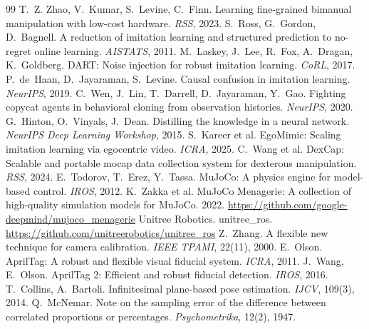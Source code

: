 \documentclass[10pt,twocolumn]{article}
\begin{document}
\begin{thebibliography}{99}\small\setlength{\itemsep}{1pt}
 T.~Z. Zhao, V.~Kumar, S.~Levine, C.~Finn. Learning fine-grained bimanual manipulation with low-cost hardware. \emph{RSS}, 2023.
 S.~Ross, G.~Gordon, D.~Bagnell. A reduction of imitation learning and structured prediction to no-regret online learning. \emph{AISTATS}, 2011.
 M.~Laskey, J.~Lee, R.~Fox, A.~Dragan, K.~Goldberg. DART: Noise injection for robust imitation learning. \emph{CoRL}, 2017.
 P.~de~Haan, D.~Jayaraman, S.~Levine. Causal confusion in imitation learning. \emph{NeurIPS}, 2019.
 C.~Wen, J.~Lin, T.~Darrell, D.~Jayaraman, Y.~Gao. Fighting copycat agents in behavioral cloning from observation histories. \emph{NeurIPS}, 2020.
 G.~Hinton, O.~Vinyals, J.~Dean. Distilling the knowledge in a neural network. \emph{NeurIPS Deep Learning Workshop}, 2015.
 S.~Kareer et al. EgoMimic: Scaling imitation learning via egocentric video. \emph{ICRA}, 2025.
 C.~Wang et al. DexCap: Scalable and portable mocap data collection system for dexterous manipulation. \emph{RSS}, 2024.
 E.~Todorov, T.~Erez, Y.~Tassa. MuJoCo: A physics engine for model-based control. \emph{IROS}, 2012.
 K.~Zakka et al. MuJoCo Menagerie: A collection of high-quality simulation models for MuJoCo. 2022. \url{https://github.com/google-deepmind/mujoco_menagerie}
 Unitree Robotics. unitree\_ros. \url{https://github.com/unitreerobotics/unitree_ros}
 Z.~Zhang. A flexible new technique for camera calibration. \emph{IEEE TPAMI}, 22(11), 2000.
 E.~Olson. AprilTag: A robust and flexible visual fiducial system. \emph{ICRA}, 2011.
 J.~Wang, E.~Olson. AprilTag 2: Efficient and robust fiducial detection. \emph{IROS}, 2016.
 T.~Collins, A.~Bartoli. Infinitesimal plane-based pose estimation. \emph{IJCV}, 109(3), 2014.
 Q.~McNemar. Note on the sampling error of the difference between correlated proportions or percentages. \emph{Psychometrika}, 12(2), 1947.
\end{thebibliography}
\end{document}

